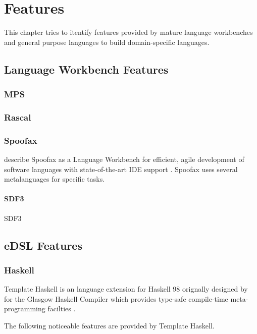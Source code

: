 \chapter{Features}

This chapter tries to itentify features provided by mature language workbenches and general purpose languages to build domain-specific languages.

\section{Language Workbench Features}


\subsection{MPS}

\subsection{Rascal}

\subsection{Spoofax}

\citeauthor{kats2010spoofax} describe Spoofax as a Language Workbench for efficient, agile development of software languages with state-of-the-art IDE support \cite{kats2010spoofax}.
Spoofax uses several metalanguages for specific tasks. 

\subsubsection{SDF3}

SDF3 

\section{eDSL Features}

\subsection{Haskell}

Template Haskell is an language extension for Haskell 98 orignally designed by \citeauthor{sheard2002template} for the Glasgow Haskell Compiler which provides type-safe compile-time meta-programming facilties \cite{sheard2002template}.

The following noticeable features are provided by Template Haskell.

